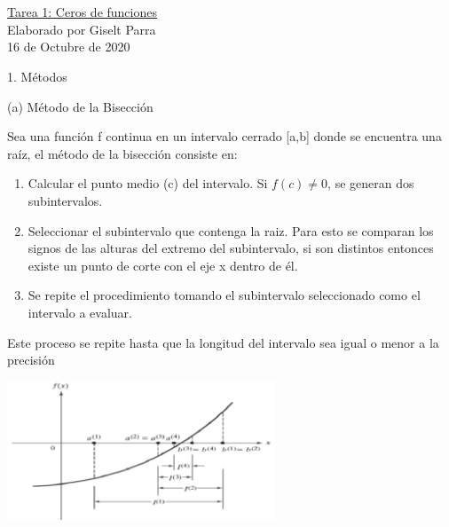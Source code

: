 \documentclass[11pt]{article}
\begin{document}
\begin{center}
 \Large \underline {\\ \\Tarea 1: Ceros de funciones} \\ \medskip
 \small  {Elaborado por Giselt Parra}\\ 
 \footnotesize{16 de Octubre de 2020}
\end{center}


\begin{center} \Large {1. Métodos} \end{center}

\justify

{\large (a) Método de la Bisección}

Sea una función f continua en un intervalo cerrado [a,b] donde se encuentra una raíz, el método de la bisección consiste en:

\begin{enumerate}
	\item[\textperiodcentered] Calcular el punto medio (c) del intervalo. Si $f(c)\neq 0$, se generan dos subintervalos.
	\item[\textperiodcentered] Seleccionar el subintervalo que contenga la raiz. Para esto se comparan los signos de las alturas del extremo del subintervalo, si son distintos entonces existe un punto de corte con el eje x dentro de él.
	\item[\textperiodcentered] Se repite el procedimiento tomando el subintervalo seleccionado como el intervalo a evaluar.
\end{enumerate}
Este proceso se repite hasta que la longitud del intervalo sea igual o menor a la precisión 

\begin{center}
    \includegraphics[keepaspectratio, width=8cm]{BM.png}
    \caption{\\}
\end{center} 

\vspace{0.5cm}
\end{document}
